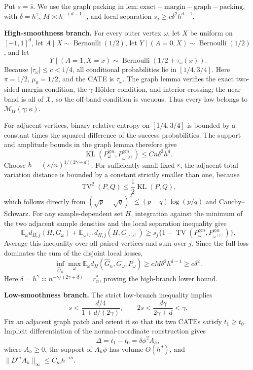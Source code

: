 Put \(s=\bar s\). We use the graph packing in \(\mathrm{lem:exact-margin-graph-packing}\), with \(\delta=h^\gamma\), \(M\asymp h^{-(d-1)}\), and local separation \(s_j\ge c\delta^2h^{d-1}\).

\textbf{High-smoothness branch.} For every outer vertex \(\omega\), let \(X\) be uniform on \([-1,1]^d\), let \(A\mid X\sim\operatorname{Bernoulli}(1/2)\), let \(Y\mid(A=0,X)\sim\operatorname{Bernoulli}(1/2)\), and let
\[
 Y\mid(A=1,X=x)\sim\operatorname{Bernoulli}(1/2+\tau_\omega(x)).
\]
Because \(|\tau_\omega|\le c<1/4\), all conditional probabilities lie in \([1/4,3/4]\). Here \(\pi=1/2\), \(\mu_0=1/2\), and the CATE is \(\tau_\omega\). The graph lemma verifies the exact two-sided margin condition, the \(\gamma\)-Hölder condition, and interior crossing; the near band is all of \(\mathcal X\), so the off-band condition is vacuous. Thus every law belongs to \(\mathcal M_{\mathrm{tr}}(\gamma;\kappa)\).

For adjacent vertices, binary relative entropy on \([1/4,3/4]\) is bounded by a constant times the squared difference of the success probabilities. The support and amplitude bounds in the graph lemma therefore give
\[
 \operatorname{KL}(P_\omega^{\otimes n},P_{\omega^{(j)}}^{\otimes n})
 \le Cn\delta^2h^d.
\]
Choose \(h=(\varepsilon/n)^{1/(2\gamma+d)}\). For sufficiently small fixed \(\varepsilon\), the adjacent total variation distance is bounded by a constant strictly smaller than one, because
\[
 \operatorname{TV}^2(P,Q)\le \frac12\operatorname{KL}(P,Q),
\]
which follows directly from \((\sqrt p-\sqrt q)^2\le(p-q)\log(p/q)\) and Cauchy--Schwarz. For any sample-dependent set \(H\), integration against the minimum of the two adjacent sample densities and the local separation inequality give
\[
 \mathbb E_\omega d_{H,j}(H,G_\omega)
 +\mathbb E_{\omega^{(j)}}d_{H,j}(H,G_{\omega^{(j)}})
 \ge s_j\{1-\operatorname{TV}(P_\omega^{\otimes n},P_{\omega^{(j)}}^{\otimes n})\}.
\]
Average this inequality over all paired vertices and sum over \(j\). Since the full loss dominates the sum of the disjoint local losses,
\[
 \inf_{\widehat G_n}\max_\omega
 \mathbb E_\omega d_H(\widehat G_n,G_\omega;P_\omega)
 \ge cM\delta^2h^{d-1}\ge c\delta^2.
\]
Here \(\delta=h^\gamma\asymp n^{-\gamma/(2\gamma+d)}=r_n^*\), proving the high-branch lower bound.

\textbf{Low-smoothness branch.} The strict low-branch inequality implies
\[
 s<\frac{d/4}{1+d/(2\gamma)},
 \qquad
 2s<\frac{d\gamma}{2\gamma+d}<\gamma.
\]
Fix an adjacent graph patch and orient it so that its two CATEs satisfy \(t_1\ge t_0\). Implicit differentiation of the normal-coordinate construction gives
\[
 \Delta=t_1-t_0=\delta\phi^2 A_h,
\]
where \(A_h\ge0\), the support of \(A_h\phi\) has volume \(O(h^d)\), and \(\|D^mA_h\|_\infty\le C_mh^{-m}\).

